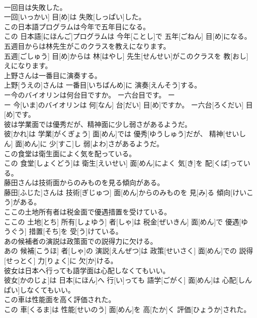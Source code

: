 \documentclass[8pt]{extreport}
\begin{document}
\begin{CJK}{UTF8}{min}
\\	一回目は失敗した。	
\\	一回[いっかい] 目[め]は 失敗[しっぱい]した。
\\	この日本語プログラムは今年で五年目になる。	
\\	この 日本語[にほんご]プログラムは 今年[ことし]で 五年[ごねん] 目[め]になる。
\\	五週目からは林先生がこのクラスを教えになります。	
\\	五週[ごしゅう] 目[め]からは 林[はやし] 先生[せんせい]がこのクラスを 教[おし]えになります。
\\	上野さんは一番目に演奏する。	
\\	上野[うえの]さんは 一番目[いちばんめ]に 演奏[えんそう]する。
\\	ー今のバイオリンは何台目ですか。 ー六台目です。	ー
\\	ー 今[いま]のバイオリンは 何[なん] 台[だい] 目[め]ですか。 ー六台[ろくだい] 目[め]です。
\\	彼は学業面では優秀だが、精神面に少し弱さがあるようだ。	
\\	彼[かれ]は 学業[がくぎょう] 面[めん]では 優秀[ゆうしゅう]だが、 精神[せいしん] 面[めん]に 少[すこ]し 弱[よわ]さがあるようだ。
\\	この食堂は衛生面によく気を配っている。	
\\	この 食堂[しょくどう]は 衛生[えいせい] 面[めん]によく 気[き]を 配[くば]っている。
\\	藤田さんは技術面からのみものを見る傾向がある。	
\\	藤田[ふじた]さんは 技術[ぎじゅつ] 面[めん]からのみものを 見[み]る 傾向[けいこう]がある。
\\	ここの土地所有者は税金面で優遇措置を受けている。	
\\	ここの 土地[とち] 所有[しょゆう] 者[しゃ]は 税金[ぜいきん] 面[めん]で 優遇[ゆうぐう] 措置[そち]を 受[う]けている。
\\	あの候補者の演説は政策面での説得力に欠ける。	
\\	あの 候補[こうほ] 者[しゃ]の 演説[えんぜつ]は 政策[せいさく] 面[めん]での 説得[せっとく] 力[りょく]に 欠[か]ける。
\\	彼女は日本へ行っても語学面は心配しなくてもいい。	
\\	彼女[かのじょ]は 日本[にほん]へ 行[い]っても 語学[ごがく] 面[めん]は 心配[しんぱい]しなくてもいい。
\\	この車は性能面を高く評価された。	
\\	この 車[くるま]は 性能[せいのう] 面[めん]を 高[たか]く 評価[ひょうか]された。

\end{CJK}
\end{document}
